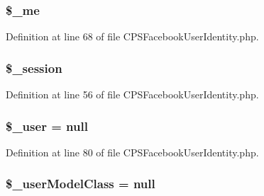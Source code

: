 \hypertarget{classCPSFacebookUserIdentity_a45e53d351918dc7cad7136ff44e1724b}{
\subsubsection[{\$\_\-me}]{\setlength{\rightskip}{0pt plus 5cm}\$\_\-me}}
\label{classCPSFacebookUserIdentity_a45e53d351918dc7cad7136ff44e1724b}


Definition at line 68 of file CPSFacebookUserIdentity.php.

\hypertarget{classCPSFacebookUserIdentity_ad0641deaf4d314f034a134efaa6fbff0}{
\subsubsection[{\$\_\-session}]{\setlength{\rightskip}{0pt plus 5cm}\$\_\-session}}
\label{classCPSFacebookUserIdentity_ad0641deaf4d314f034a134efaa6fbff0}


Definition at line 56 of file CPSFacebookUserIdentity.php.

\hypertarget{classCPSFacebookUserIdentity_a5df5982b9dadc74df05081972cd67fdf}{
\subsubsection[{\$\_\-user}]{\setlength{\rightskip}{0pt plus 5cm}\$\_\-user = null}}
\label{classCPSFacebookUserIdentity_a5df5982b9dadc74df05081972cd67fdf}


Definition at line 80 of file CPSFacebookUserIdentity.php.

\hypertarget{classCPSFacebookUserIdentity_a86b918c4cc90bae631b0f42b136d3a3c}{
\subsubsection[{\$\_\-userModelClass}]{\setlength{\rightskip}{0pt plus 5cm}\$\_\-userModelClass = null}}
\label{classCPSFacebookUserIdentity_a86b918c4cc90bae631b0f42b136d3a3c}


